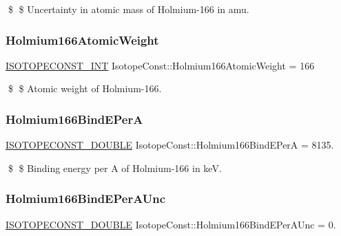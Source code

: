 \$ \$ Uncertainty in atomic mass of Holmium-\/166 in amu. \mbox{\label{group___isotope_const-_holmium-_ho166_ga1436ac0f3e072dc56649e03d11dd27ce}} 
\subsubsection{\texorpdfstring{Holmium166\+Atomic\+Weight}{Holmium166AtomicWeight}}
{\footnotesize\ttfamily \mbox{\hyperlink{group___isotope_const-_macros_ga5f18360b3e99483a35c32d789e62621c}{I\+S\+O\+T\+O\+P\+E\+C\+O\+N\+S\+T\+\_\+\+I\+NT}} Isotope\+Const\+::\+Holmium166\+Atomic\+Weight = 166}

\$ \$ Atomic weight of Holmium-\/166. \mbox{\label{group___isotope_const-_holmium-_ho166_gae86713a7e710f98bee3a86f8c7ac36df}} 
\subsubsection{\texorpdfstring{Holmium166\+Bind\+E\+PerA}{Holmium166BindEPerA}}
{\footnotesize\ttfamily \mbox{\hyperlink{group___isotope_const-_macros_ga8f45a7272ce02c0b4c65c44636ed719a}{I\+S\+O\+T\+O\+P\+E\+C\+O\+N\+S\+T\+\_\+\+D\+O\+U\+B\+LE}} Isotope\+Const\+::\+Holmium166\+Bind\+E\+PerA = 8135.}

\$ \$ Binding energy per A of Holmium-\/166 in keV. \mbox{\label{group___isotope_const-_holmium-_ho166_ga0d69bec4381acaf3a94952c7821b35a7}} 
\subsubsection{\texorpdfstring{Holmium166\+Bind\+E\+Per\+A\+Unc}{Holmium166BindEPerAUnc}}
{\footnotesize\ttfamily \mbox{\hyperlink{group___isotope_const-_macros_ga8f45a7272ce02c0b4c65c44636ed719a}{I\+S\+O\+T\+O\+P\+E\+C\+O\+N\+S\+T\+\_\+\+D\+O\+U\+B\+LE}} Isotope\+Const\+::\+Holmium166\+Bind\+E\+Per\+A\+Unc = 0.}

